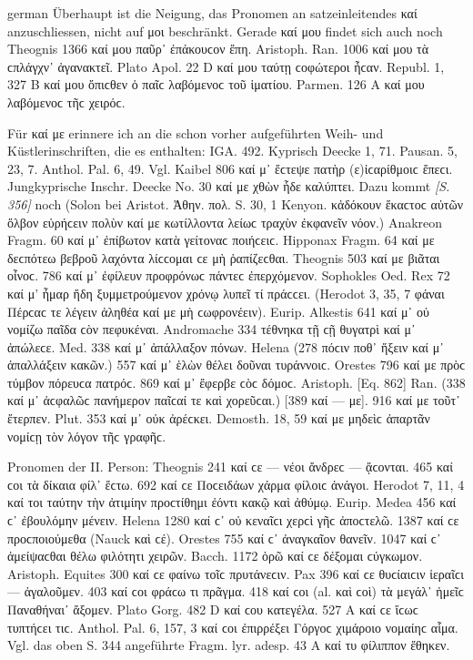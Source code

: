 \begin{otherlanguage*}{german}
Überhaupt ist die Neigung, das Pronomen an satzeinleitendes καί anzuschliessen, nicht auf μοι beschränkt. Gerade καί μου findet sich auch noch Theognis 1366 καί μου παῦρ᾽ ἐπάκουϲον ἔπη. Aristoph. Ran. 1006 καί μου τὰ ϲπλάγχν᾽ ἀγανακτεῖ. Plato Apol. 22 D καί μου ταύτῃ ϲοφώτεροι ἦϲαν. Republ. 1, 327 Β καί μου ὄπιϲθεν ὁ παῖϲ λαβόμενοϲ τοῦ ἱματίου. Parmen. 126 Α καί μου λαβόμενοϲ τῆϲ χειρόϲ.

Für καί με erinnere ich an die schon vorher aufgeführten Weih- und Küstlerinschriften, die es enthalten: IGA. 492. Kyprisch Deecke 1, 71. Pausan. 5, 23, 7. Anthol. Pal. 6, 49. Vgl. Kaibel 806 καί μ᾽ ἔϲτεψε πατὴρ (ε)ἰϲαρίθμοιϲ ἔπεϲι. Jungkyprische Inschr. Deecke No. 30 καί με χθὼν ἧδε καλύπτει. Dazu kommt \hypertarget{p356}{\emph{[S. 356]}}\label{p356} noch (Solon bei Aristot. Ἀθην. πολ. S. 30, 1 Kenyon. κἀδόκουν ἕκαϲτοϲ αὐτῶν ὄλβον εὑρήϲειν πολὺν καί με κωτίλλοντα λείωϲ τραχὺν ἐκφανεῖν νόον.) Anakreon Fragm. 60 καί μ᾽ ἐπίβωτον κατὰ γείτοναϲ ποιήϲειϲ. Hipponax Fragm. 64 καί με δεϲπότεω βεβροῦ λαχόντα λίϲϲομαι ϲε μὴ ῥαπίζεϲθαι. Theognis 503 καί με βιᾶται οἶνοϲ. 786 καί μ᾽ ἐφίλευν προφρόνωϲ πάντεϲ ἐπερχόμενον. Sophokles Oed. Rex 72 καί μ’ ἦμαρ ἤδη ξυμμετρούμενον χρόνῳ λυπεῖ τί πράϲϲει. (Herodot 3, 35, 7 φάναι Πέρϲαϲ τε λέγειν ἀληθέα καί με μὴ ϲωφρονέειν). Eurip. Alkestis 641 καί μ᾽ οὐ νομίζω παῖδα ϲὸν πεφυκέναι. Andromache 334 τέθνηκα τῇ ϲῇ θυγατρὶ καί μ᾽ ἀπώλεϲε. Med. 338 καί μ᾽ ἀπάλλαξον πόνων. Helena (278 πόϲιν ποθ᾽ ἥξειν καί μ᾽ ἀπαλλάξειν κακῶν.) 557 καί μ᾽ ἑλὼν θέλει δοῦναι τυράννοιϲ. Orestes 796 καί με πρὸϲ τύμβον πόρευϲα πατρόϲ. 869 καί μ᾽ ἔφερβε ϲὸϲ δόμοϲ. Aristoph. [Eq. 862] Ran. (338 καί μ᾽ ἀϲφαλῶϲ πανήμερον παῖϲαί τε καὶ χορεῦϲαι.) [389 καί — με]. 916 καί με τοῦτ᾽ ἔτερπεν. Plut. 353 καί μ᾽ οὐκ ἀρέϲκει. Demosth. 18, 59 καί με μηδεὶϲ ἀπαρτᾶν νομίϲῃ τὸν λόγον τῆϲ γραφῆϲ.

Pronomen der II. Person: Theognis 241 καί ϲε — νέοι ἄνδρεϲ — ᾄϲονται. 465 καί ϲοι τὰ δίκαια φίλ᾽ ἔϲτω. 692 καί ϲε Ποϲειδάων χάρμα φίλοιϲ ἀνάγοι. Herodot 7, 11, 4 καί τοι ταύτην τὴν ἀτιμίην προϲτίθημι ἐόντι κακῷ καὶ ἀθύμῳ. Eurip. Medea 456 καί ϲ᾽ ἐβουλόμην μένειν. Helena 1280 καί ϲ᾽ οὐ κεναῖϲι χερϲὶ γῆϲ ἀποϲτελῶ. 1387 καί ϲε προϲποιούμεθα (Nauck καὶ ϲέ). Orestes 755 καί ϲ᾽ ἀναγκαῖον θανεῖν. 1047 καί ϲ᾽ ἀμείψαϲθαι θέλω φιλότητι χειρῶν. Bacch. 1172 ὁρῶ καί ϲε δέξομαι ϲύγκωμον. Aristoph. Equites 300 καί ϲε φαίνω τοῖϲ πρυτάνεϲιν. Pax 396 καί ϲε θυϲίαιϲιν ἱεραῖϲι — ἀγαλοῦμεν. 403 καί ϲοι φράϲω τι πρᾶγμα. 418 καί ϲοι (al. καὶ ϲοὶ) τὰ μεγάλ᾽ ἡμεῖϲ Παναθήναι᾽ ἄξομεν. Plato Gorg. 482 D καί ϲου κατεγέλα. 527 Α καί ϲε ἴϲωϲ τυπτήϲει τιϲ. Anthol. Pal. 6, 157, 3 καί ϲοι ἐπιρρέξει Γόργοϲ χιμάροιο νομαίηϲ αἷμα. Vgl. das oben S. 344 angeführte Fragm. lyr. adesp. 43 A καί τυ φίλιππον ἔθηκεν.


\end{otherlanguage*}
